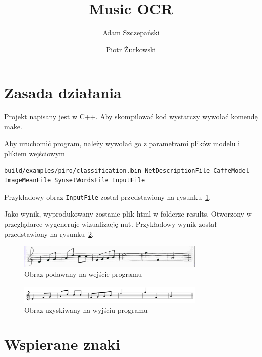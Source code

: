 \documentclass[a4paper,11pt]{article}
\title{Music OCR}
\author{
	Adam Szczepański
	\and
	Piotr Żurkowski
}
\begin{document}
\maketitle

\section{Zasada działania}

Projekt napisany jest w C++. Aby skompilować kod wystarczy wywołać komendę make.

Aby uruchomić program, należy wywołać go z parametrami plików modelu i plikiem wejściowym

\begin{lstlisting}
build/examples/piro/classification.bin NetDescriptionFile CaffeModel ImageMeanFile SynsetWordsFile InputFile
\end{lstlisting}

Przykładowy obraz \texttt{InputFile} został przedstawiony na rysunku~\ref{fig:in}.

Jako wynik, wyprodukowany zostanie plik html w folderze results. Otworzony w przeglądarce wygeneruje wizualizację nut. Przykładowy wynik został przedstawiony na rysunku~\ref{fig:out}.

\begin{figure}
\centering
\includegraphics[width=0.8\textwidth]{in.jpg}
\caption{Obraz podawany na wejście programu}
\label{fig:in}
\end{figure}

\begin{figure}
\centering
\includegraphics[width=0.8\textwidth]{out.png}
\caption{Obraz uzyskiwany na wyjściu programu}
\label{fig:out}
\end{figure}

\section{Wspierane znaki}
\end{document}
